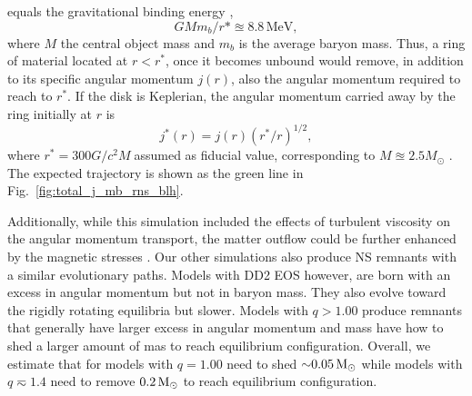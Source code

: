 equals the gravitational binding energy
\citep[\eg][]{Fernandez:2013tya}, 
%
\begin{equation*}
    G M m_b / r* \approxeq 8.8\, \text{MeV}, 
\end{equation*}
%
where $M$ the central object mass and $m_b$ is the average baryon mass.
Thus, a ring of material located at $r < r^*$, once it becomes unbound
would remove, in addition to its specific angular
momentum $j(r)$, also the angular momentum required to reach
to $r^*$. If the disk is Keplerian, the 
 angular momentum carried away by the ring initially at
$r$ is 
%
\begin{equation*}
    j^*(r) = j(r) ( r^* / r )^{1/2},
\end{equation*}
%
where $r^* = 300 G/c^2M$assumed as fiducial value, corresponding
to $M \approxeq 2.5M_{\odot}$ \citep{Radice:2018xqa}.
The expected trajectory is shown as the green line in Fig.~\ref{fig:total_j_mb_rns_blh}.

Additionally, while this simulation included the effects of turbulent viscosity on the
angular momentum transport, the matter outflow could be further enhanced by the magnetic stresses 
\citep{Metzger:2006mw,Bucciantini:2011kx,Siegel:2017nub,Fernandez:2018kax,Ciolfi:2020hgg}.
%
%
Our other simulations also produce \ac{NS} remnants with a similar evolutionary paths. 
Models with DD2 \ac{EOS} however, are born with an excess in angular momentum but not in 
baryon mass. They also evolve toward the rigidly rotating equilibria but slower.
Models with $q>1.00$ produce remnants that generally have larger excess in angular momentum 
and mass have how to shed a larger amount of mas to reach equilibrium configuration.
Overall, we estimate that for models with $q=1.00$ need to shed ${\sim}0.05\,{\text{M}_{\odot}}$ while 
models with $q\eqsim 1.4$ need to remove $0.2\,{\text{M}_{\odot}}$ to reach equilibrium configuration.
















